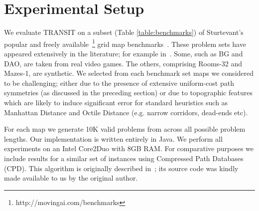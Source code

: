 \section{Experimental Setup}
\label{sec:setup}


We evaluate TRANSIT on a subset (Table \ref{table:benchmarks})
of Sturtevant's popular and freely
available~\footnote{http://movingai.com/benchmarks}
grid map benchmarks~\cite{sturtevant2012benchmarks}.
These problem sets have appeared extensively in the literature;
for example in~\cite{botea04,bjornsson06,sturtevant07,felner09,pochter09,goldenberg10,harabor11b}.
Some, such as BG and DAO, are taken from real video games. The others,
comprising Rooms-32 and Mazes-1, are synthetic.
We selected from each benchmark set maps we considered to be challenging;
either due to the presence of extensive uniform-cost path symmetries
(as discussed in the preceding section)
or due to topographic features which are likely to induce significant
error for standard heuristics such as Manhattan Distance and Octile Distance (e.g. narrow corridors,
dead-ends etc).


For each map we generate 10K valid problems from across all possible problem lengths.
Our implementation is written entirely in Java. We perform all experiments
on an Intel Core2Duo with 8GB RAM.
For comparative purposes we include results for a similar set of instances
using Compressed Path Databases (CPD). This algorithm is originally described in~\cite{botea11};
its source code was kindly made available to us by the original author.


